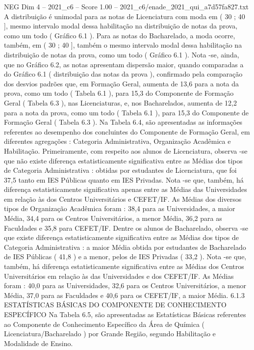 \begin{textsample}{NEG Dim 4 – 2021\_c6 – Score 1.00 – 2021\_c6/enade\_2021\_qui\_a7d57fa827.txt}
A distribuição é unimodal para as notas de Licenciatura com moda em ( 30 ; 40 ], mesmo intervalo modal dessa habilitação na distribuição de notas da prova, como um todo ( Gráfico 6.1 ).
Para as notas do Bacharelado, a moda ocorre, também, em ( 30 ; 40 ], também o mesmo intervalo modal dessa habilitação na distribuição de notas da prova, como um todo ( Gráfico 6.1 ).
Nota -se, ainda, que no Gráfico 6.2, as notas apresentam dispersão maior, quando comparadas a do Gráfico 6.1 ( distribuição das notas da prova ), confirmado pela comparação dos desvios padrões que, em Formação Geral, aumenta de 13,6 para a nota da prova, como um todo ( Tabela 6.1 ), para 15,3 do Componente de Formação Geral ( Tabela 6.3 ), nas Licenciaturas, e, nos Bacharelados, aumenta de 12,2 para a nota da prova, como um todo ( Tabela 6.1 ), para 15,3 do Componente de Formação Geral ( Tabela 6.3 ).
Na Tabela 6.4, são apresentadas as informações referentes ao desempenho dos concluintes do Componente de Formação Geral, em diferentes agregações : Categoria Administrativa, Organização Acadêmica e Habilitação.
Primeiramente, com respeito aos alunos de Licenciatura, observa -se que não existe diferença estatisticamente significativa entre as Médias dos tipos de Categoria Administrativa : obtidas por estudantes de Licenciatura, que foi 37,5 tanto em IES Públicas quanto em IES Privadas.
Nota -se que, também, há diferença estatisticamente significativa apenas entre as Médias das Universidades em relação às dos Centros Universitários e CEFET/IF.
As Médias dos diversos tipos de Organização Acadêmica foram : 38,4 para as Universidades, a maior Média, 34,4 para os Centros Universitários, a menor Média, 36,2 para as Faculdades e 35,8 para CEFET/IF.
Dentre os alunos de Bacharelado, observa -se que existe diferença estatisticamente significativa entre as Médias dos tipos de Categoria Administrativa : a maior Média obtida por estudantes de Bacharelado de IES Públicas ( 41,8 ) e a menor, pelos de IES Privadas ( 33,2 ).
Nota -se que, também, há diferença estatisticamente significativa entre as Médias dos Centros Universitários em relação às das Universidades e dos CEFET/IF.
As Médias foram : 40,0 para as Universidades, 32,6 para os Centros Universitários, a menor Média, 37,0 para as Faculdades e 40,6 para os CEFET/IF, a maior Média. 6.1.3 ESTATÍSTICAS BÁSICAS DO COMPONENTE DE CONHECIMENTO ESPECÍFICO Na Tabela 6.5, são apresentadas as Estatísticas Básicas referentes ao Componente de Conhecimento Específico da Área de Química ( Licenciatura/Bacharelado ) por Grande Região, segundo Habilitação e Modalidade de Ensino.

\end{textsample}
